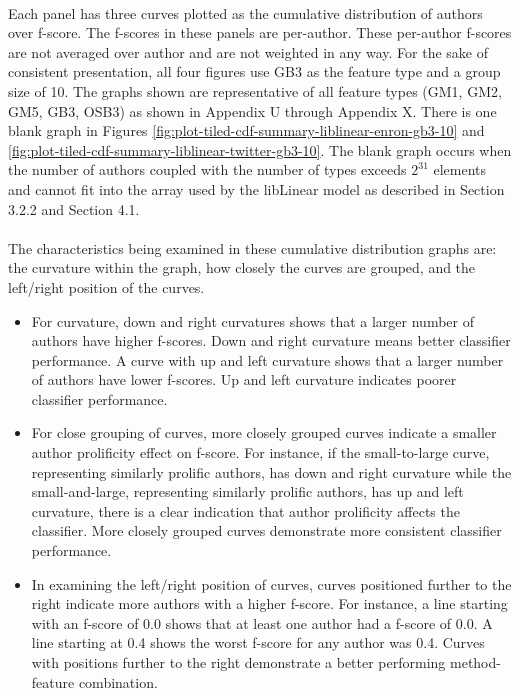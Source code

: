 	\paragraph*{}Each panel has three curves plotted as the cumulative distribution of authors over f-score.  The f-scores in these panels are per-author. These per-author f-scores are not averaged over author and are not weighted in any way.  For the sake of consistent presentation, all four figures use GB3 as the feature type and a group size of 10.  The graphs shown are representative of all feature types (GM1, GM2, GM5, GB3, OSB3) as shown in Appendix U through Appendix X. There is one blank graph in Figures \ref{fig:plot-tiled-cdf-summary-liblinear-enron-gb3-10} and \ref{fig:plot-tiled-cdf-summary-liblinear-twitter-gb3-10}.  The blank graph occurs when the number of authors coupled with the number of types exceeds $2^{31}$ elements and cannot fit into the array used by the libLinear model as described in Section 3.2.2 and Section 4.1.
	
	\paragraph*{} The characteristics being examined in these cumulative distribution graphs are: the curvature within the graph, how closely the curves are grouped, and the left/right position of the curves.  
	\begin{itemize}
		\item For curvature, down and right curvatures shows that a larger number of authors have higher f-scores. Down and right curvature means better classifier performance. A curve with up and left curvature shows that a larger number of authors have lower f-scores.  Up and left curvature indicates poorer classifier performance.
		\item For close grouping of curves, more closely grouped curves indicate a smaller author prolificity effect on f-score.  For instance, if the small-to-large curve, representing similarly prolific authors, has down and right curvature while the small-and-large, representing similarly prolific authors, has up and left curvature, there is a clear indication that author prolificity affects the classifier.  More closely grouped curves demonstrate more consistent classifier performance.
		\item In examining the left/right position of curves, curves positioned further to the right indicate more authors with a higher f-score. For instance, a line starting with an f-score of 0.0 shows that at least one author had a f-score of 0.0.  A line starting at 0.4 shows the worst f-score for any author was 0.4.  Curves with positions further to the right demonstrate a better performing method-feature combination.
	\end{itemize}
	
